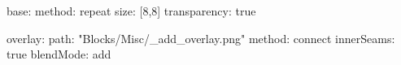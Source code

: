 base:
  method: repeat
  size: [8,8]
  transparency: true

overlay:
  path: "Blocks/Misc/_add_overlay.png"
  method: connect
  innerSeams: true
  blendMode: add